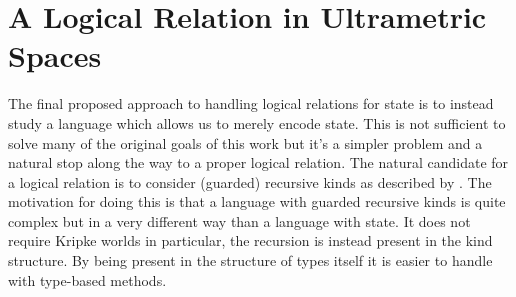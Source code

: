 \section{A Logical Relation in Ultrametric Spaces}\label{sec:guarded}

The final proposed approach to handling logical relations for state is
to instead study a language which allows us to merely encode
state. This is not sufficient to solve many of the original goals of
this work but it's a simpler problem and a natural stop along the way
to a proper logical relation. The natural candidate for a logical
relation is to consider (guarded) recursive kinds as described by
\citet{TODO-FORK}. The motivation for doing this is that a language
with guarded recursive kinds is quite complex but in a very different
way than a language with state. It does not require Kripke worlds in
particular, the recursion is instead present in the kind structure. By
being present in the structure of types itself it is easier to handle
with type-based methods.

